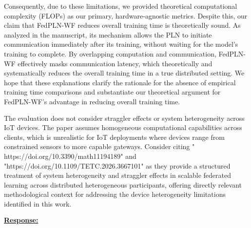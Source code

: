 \documentclass[a4paper,12pt]{article}
\begin{document}
Consequently, due to these limitations, we provided theoretical computational complexity (FLOPs) as our primary, hardware-agnostic metrics.
Despite this, our claim that FedPLN-WF reduces overall training time is theoretically sound.
As analyzed in the manuscript, its mechanism allows the PLN to initiate communication immediately after its training, without waiting for the model's training to complete.
By overlapping computation and communication, FedPLN-WF effectively masks communication latency, which theoretically and systematically reduces the overall training time in a true distributed setting.
We hope that these explanations clarify the rationale for the absence of empirical training time comparisons and substantiate our theoretical argument for FedPLN-WF's advantage in reducing overall training time.

\begin{tcolorbox}[title = {Comment 7},fonttitle = \bfseries]
	The evaluation does not consider straggler effects or system heterogeneity across IoT devices. The paper assumes homogeneous computational capabilities across clients, which is unrealistic for IoT deployments where devices range from constrained sensors to more capable gateways. Consider citing " https://doi.org/10.3390/math11194189" and "https://doi.org/10.1109/TETC.2026.3667101" as they provide a structured treatment of system heterogeneity and straggler effects in scalable federated learning across distributed heterogeneous participants, offering directly relevant methodological context for addressing the device heterogeneity limitations identified in this work.
\end{tcolorbox}

\noindent \underline {\textbf{Response:}}
\bigskip
\end{document}
